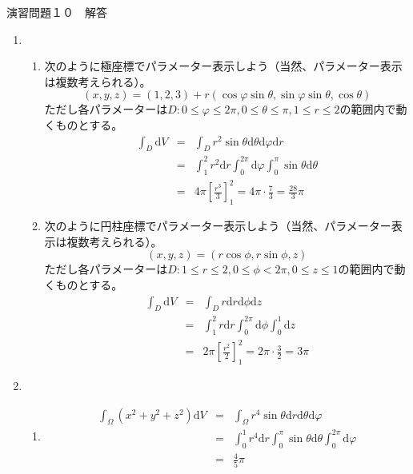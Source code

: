 \documentclass{jarticle}
\def\d{\mathrm d}
\begin{document}
\begin{center} {\Large 演習問題１０　解答} \end{center}
  \begin{enumerate}
    \item
      \begin{enumerate}
        \item
          次のように極座標でパラメーター表示しよう（当然、パラメーター表示は複数考えられる）。
          \[ (x,y,z)=(1,2,3)+r(\cos\varphi\sin\theta,\sin\varphi\sin\theta,\cos\theta) \]
          ただし各パラメーターは$D: 0 \leq \varphi \leq 2\pi, 0 \leq \theta \leq \pi, 1 \leq r \leq 2$の範囲内で動くものとする。 
          \begin{eqnarray*}
            \int_D \d V & = & \int_D r^2 \sin\theta \d \theta \d \varphi \d r \\
            & = & \int_1^2 r^2 \d r \int_0^{2\pi} \d \varphi \int_0^{\pi} \sin \theta \d \theta \\
            & = & 4\pi \left[ \frac{r^3}{3} \right]_1^2 = 4\pi \cdot \frac{7}{3} = \frac{28}{3} \pi
          \end{eqnarray*}
        \item
          次のように円柱座標でパラメーター表示しよう（当然、パラメーター表示は複数考えられる）。
          \[ (x,y,z)=(r\cos\phi,r\sin\phi,z) \]
          ただし各パラメーターは$D: 1 \leq r \leq 2, 0 \leq \phi < 2\pi, 0 \leq z \leq 1$の範囲内で動くものとする。
          \begin{eqnarray*}
            \int_D \d V & = & \int_D r \d r \d \phi \d z \\
            & = & \int_1^2 r \d r \int_0^{2\pi} \d \phi \int_0^1 \d z \\
            & = & 2\pi \left[ \frac{r^2}{2} \right]_1^2 = 2\pi \cdot \frac{3}{2} = 3\pi
          \end{eqnarray*}
      \end{enumerate}
    \item
      \begin{enumerate}
        \item
          \begin{eqnarray*}
            \int_\Omega (x^2+y^2+z^2) \d V & = & \int_\Omega r^4 \sin\theta \d r \d \theta \d \varphi \\
            & = & \int_0^1 r^4 \d r \int_0^{\pi} \sin \theta \d \theta \int_0^{2\pi} \d \varphi \\
            & = & \frac{4}{5} \pi
          \end{eqnarray*}

\end{enumerate}
\end{enumerate}
\end{document}
